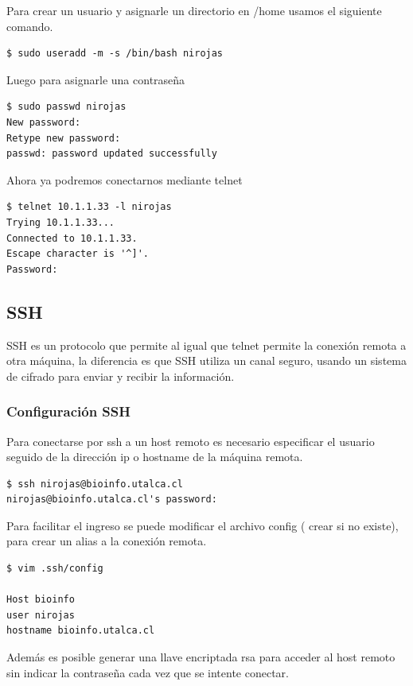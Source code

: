 \documentclass[12pt]{article}
\begin{document}
Para crear un usuario y asignarle un directorio en /home usamos el siguiente comando.

\begin{lstlisting}[frame=single]
$ sudo useradd -m -s /bin/bash nirojas
\end{lstlisting}

Luego para asignarle una contraseña 

\begin{lstlisting}[frame=single]
$ sudo passwd nirojas
New password:
Retype new password:
passwd: password updated successfully
\end{lstlisting}

Ahora ya podremos conectarnos mediante telnet
\begin{lstlisting}[frame=single]
$ telnet 10.1.1.33 -l nirojas
Trying 10.1.1.33...
Connected to 10.1.1.33.
Escape character is '^]'.
Password:
\end{lstlisting}

\subsection{SSH}

SSH es un protocolo que permite al igual que telnet permite la conexión remota a otra máquina, la diferencia es que SSH utiliza un canal seguro, usando un sistema de cifrado para enviar y recibir la información.\cite{ssh}

\subsubsection{Configuración SSH}

Para conectarse por ssh a un host remoto es necesario especificar el usuario seguido de la dirección ip o hostname de la máquina remota.

\begin{lstlisting}[frame=single]
$ ssh nirojas@bioinfo.utalca.cl
nirojas@bioinfo.utalca.cl's password:
\end{lstlisting}

Para facilitar el ingreso se puede modificar el archivo config ( crear si no existe), para crear un alias a la conexión remota.
\begin{lstlisting}[frame=single]
$ vim .ssh/config

Host bioinfo
user nirojas
hostname bioinfo.utalca.cl
\end{lstlisting}

Además es posible generar una llave encriptada rsa para acceder al host remoto sin indicar la contraseña cada vez que se intente conectar.
\end{document}
